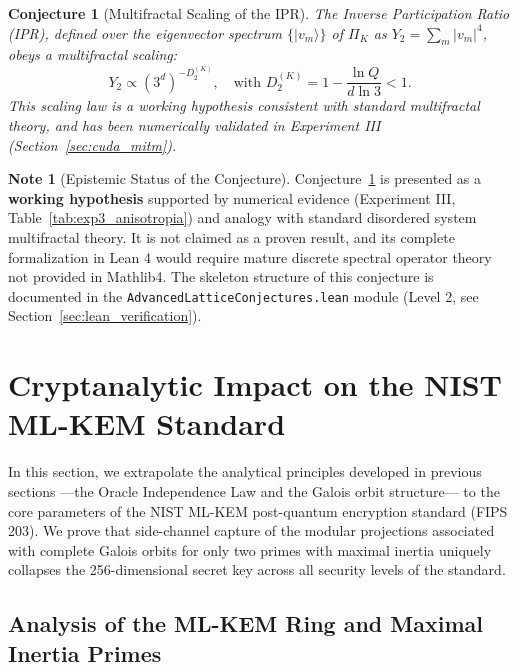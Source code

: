 \documentclass[11pt,a4paper]{article}
\theoremstyle{plain}
\newtheorem{conjetura}[teorema]{Conjecture}
\theoremstyle{definition}
\newtheorem{remark}[teorema]{Note}
\numberwithin{equation}{section}
\begin{document}
\begin{conjetura}[Multifractal Scaling of the IPR]
\label{conj:eth_violation}
The Inverse Participation Ratio (IPR), defined over the eigenvector spectrum $\{|v_m\rangle\}$ of $\Pi_K$ as $Y_2 = \sum_m |v_m|^4$, obeys a multifractal scaling:
\begin{equation}
Y_2 \propto (3^d)^{-D_2^{(K)}}, \quad \text{with } D_2^{(K)} = 1 - \frac{\ln Q}{d \ln 3} < 1.
\end{equation}
This scaling law is a \emph{working hypothesis} consistent with standard multifractal theory, and has been numerically validated in Experiment III (Section~\ref{sec:cuda_mitm}).
\end{conjetura}

\begin{remark}[Epistemic Status of the Conjecture]
\label{rem:estatus_conjetura}
Conjecture~\ref{conj:eth_violation} is presented as a \textbf{working hypothesis} supported by numerical evidence (Experiment III, Table~\ref{tab:exp3_anisotropia}) and analogy with standard disordered system multifractal theory. It is not claimed as a proven result, and its complete formalization in Lean 4 would require mature discrete spectral operator theory not provided in Mathlib4. The skeleton structure of this conjecture is documented in the \texttt{AdvancedLatticeConjectures.lean} module (Level 2, see Section~\ref{sec:lean_verification}).
\end{remark}

\section{Cryptanalytic Impact on the NIST ML-KEM Standard}
\label{sec:impacto_mlkem}

In this section, we extrapolate the analytical principles developed in previous sections —the Oracle Independence Law and the Galois orbit structure— to the core parameters of the NIST ML-KEM post-quantum encryption standard (FIPS 203). We prove that side-channel capture of the modular projections associated with complete Galois orbits for only two primes with maximal inertia uniquely collapses the 256-dimensional secret key across all security levels of the standard.

\subsection{Analysis of the ML-KEM Ring and Maximal Inertia Primes}
\label{subsec:anillo_mlkem}
\end{document}
